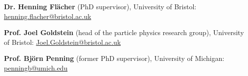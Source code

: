 

\begin{cventries}

    \cventry
    {} %
    {} %
    {} %
    {} %
    {
      \vspace{-6mm}
      \begin{cvitems}
        \item {\textbf{Dr. Henning Fl\"{a}cher} (PhD supervisor), University of Bristol: \href{mailto:henning.flacher@bristol.ac.uk}{henning.flacher@bristol.ac.uk}}
        \item {\textbf{Prof. Joel Goldstein} (head of the particle physics research group), University of Bristol: \href{mailto:joel.goldstein@bristol.ac.uk}{Joel.Goldstein@bristol.ac.uk}}
        \item {\textbf{Prof. Bj\"{o}rn Penning} (former PhD supervisor), University of Michigan: \href{mailto:penningb@umich.edu}{penningb@umich.edu}}
      \end{cvitems}
    }
\end{cventries}
